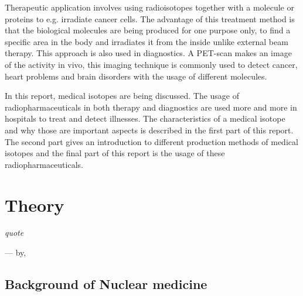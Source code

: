 \documentclass[twoside,english]{uiofysmaster/uiofysmaster}
\begin{document}
Therapeutic application involves using radioisotopes together with a molecule or proteins to e.g. irradiate cancer cells. The advantage of this treatment method is that the biological molecules are being produced for one purpose only, to find a specific area in the body and irradiates it from the inside unlike external beam therapy. This approach is also used in diagnostics. A PET-scan makes an image of the activity in vivo, this imaging technique is commonly used to detect cancer, heart problems and brain disorders with the usage of different molecules.


In this report, medical isotopes are being discussed. The usage of radiopharmaceuticals in both therapy and diagnostics are used more and more in hospitals to treat and detect illnesses. The characteristics of a medical isotope and why those are important aspects is described in the first part of this report. The second part gives an introduction to different production methods of medical isotopes and the final part of this report is the usage of these radiopharmaceuticals.  




\chapter{Theory}
\label{ch: beyond}

\epigraph{\itshape quote}{--- \textup{by}, }
 


\section{Background of Nuclear medicine}
\label{sec:Background}
\end{document}
